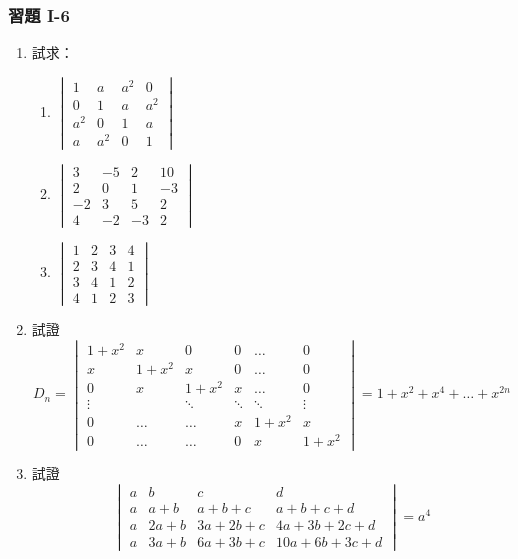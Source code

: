 \subsubsection*{習題 I-6}\label{sec:b6s-ex1-6}

\begin{enumerate}[label=\arabic*., leftmargin=2em]
  \item 試求：
  \begin{enumerate}[label=(\roman*)]
    \item $\begin{vmatrix}
    1 & a & a^2 & 0 \\
    0 & 1 & a & a^2 \\
    a^2 & 0 & 1 & a \\
    a & a^2 & 0 & 1
    \end{vmatrix}$
    \item $\begin{vmatrix}
    3 & -5 & 2 & 10 \\
    2 & 0 & 1 & -3 \\
    -2 & 3 & 5 & 2 \\
    4 & -2 & -3 & 2
    \end{vmatrix}$
    \item $\begin{vmatrix}
    1 & 2 & 3 & 4 \\
    2 & 3 & 4 & 1 \\
    3 & 4 & 1 & 2 \\
    4 & 1 & 2 & 3
    \end{vmatrix}$
  \end{enumerate}

  \item 試證
  \[ D_n = \begin{vmatrix}
  1+x^2 & x & 0 & 0 & \dots & 0 \\
  x & 1+x^2 & x & 0 & \dots & 0 \\
  0 & x & 1+x^2 & x & \dots & 0 \\
  \vdots & & \ddots & \ddots & \ddots & \vdots \\
  0 & \dots & \dots & x & 1+x^2 & x \\
  0 & \dots & \dots & 0 & x & 1+x^2
  \end{vmatrix} = 1 + x^2 + x^4 + \dots + x^{2n} \]

  \item 試證
  \[ \begin{vmatrix}
  a & b & c & d \\
  a & a+b & a+b+c & a+b+c+d \\
  a & 2a+b & 3a+2b+c & 4a+3b+2c+d \\
  a & 3a+b & 6a+3b+c & 10a+6b+3c+d
  \end{vmatrix} = a^4 \]


\end{enumerate}
